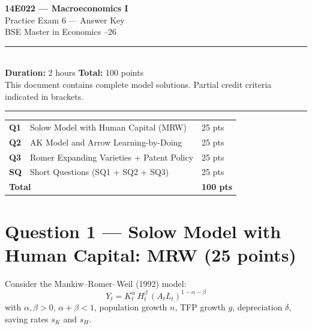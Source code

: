 \documentclass[a4paper,11pt]{article}
\begin{document}
\begin{center}
  {\LARGE\bfseries 14E022 --- Macroeconomics I}\\[6pt]
  {\Large Practice Exam 6 --- Answer Key}\\[4pt]
  {\large BSE Master in Economics --26}\\[10pt]
  \rule{\linewidth}{0.6pt}\\[6pt]
  {\normalsize \textbf{Duration:} 2 hours \quad
   \textbf{Total:} 100 points}\\[4pt]
  {\small This document contains complete model solutions. Partial credit criteria indicated in brackets.}\\[2pt]
  \rule{\linewidth}{0.4pt}
\end{center}

\vspace{4pt}
\begin{pointsbox}[title=Point Allocation]
  \begin{tabular}{lll}
    \textbf{Q1} & Solow Model with Human Capital (MRW) & 25 pts \\
    \textbf{Q2} & AK Model and Arrow Learning-by-Doing & 25 pts \\
    \textbf{Q3} & Romer Expanding Varieties + Patent Policy & 25 pts \\
    \textbf{SQ} & Short Questions (SQ1 + SQ2 + SQ3) & 25 pts \\
    \multicolumn{2}{l}{\textbf{Total}} & \textbf{100 pts}
  \end{tabular}
\end{pointsbox}

\clearpage

\section*{Question 1 --- Solow Model with Human Capital: MRW \hfill (25 points)}

Consider the Mankiw--Romer--Weil (1992) model:
\[
  Y_t = K_t^{\alpha}\, H_t^{\beta}\,(A_t L_t)^{1-\alpha-\beta}
\]
with $\alpha,\beta>0$, $\alpha+\beta<1$, population growth $n$, TFP growth $g$, depreciation $\delta$, saving rates $s_K$ and $s_H$.
\end{document}
